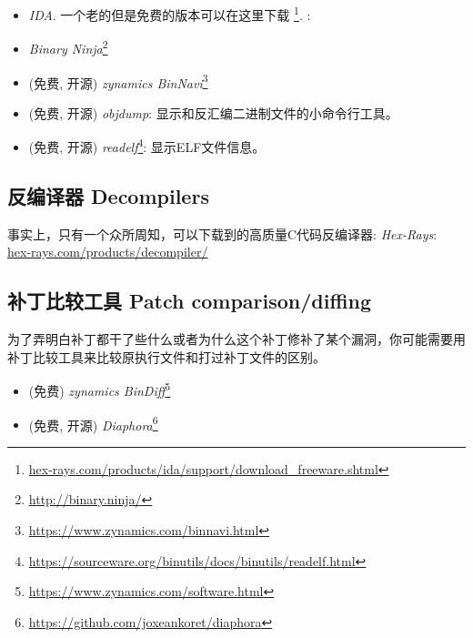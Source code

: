 \documentclass[UTF8,nofonts]{ctexart}
\begin{document}
\begin{itemize}
\item \emph{IDA}. 一个老的但是免费的版本可以在这里下载
\footnote{\href{http://go.yurichev.com/17031}{hex-rays.com/products/ida/support/download\_freeware.shtml}}.
\ShortHotKeyCheatsheet: 


\item \emph{Binary Ninja}\footnote{\url{http://binary.ninja/}}

\item (免费, 开源) \emph{zynamics BinNavi}\footnote{\url{https://www.zynamics.com/binnavi.html}}

\item (免费, 开源) \emph{objdump}: 显示和反汇编二进制文件的小命令行工具。

\item (免费, 开源) \emph{readelf}\footnote{\url{https://sourceware.org/binutils/docs/binutils/readelf.html}}:
显示ELF文件信息。
\end{itemize}

\subsection{反编译器 Decompilers}

事实上，只有一个众所周知，可以下载到的高质量C代码反编译器: \emph{Hex-Rays}:\\
\href{http://go.yurichev.com/17033}{hex-rays.com/products/decompiler/}


\subsection{补丁比较工具 Patch comparison/diffing}

为了弄明白补丁都干了些什么或者为什么这个补丁修补了某个漏洞，你可能需要用补丁比较工具来比较原执行文件和打过补丁文件的区别。

\begin{itemize}
\item (免费) \emph{zynamics BinDiff}\footnote{\url{https://www.zynamics.com/software.html}}

\item (免费, 开源) \emph{Diaphora}\footnote{\url{https://github.com/joxeankoret/diaphora}}
\end{itemize}
\end{document}
